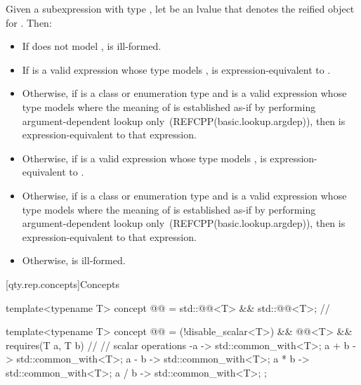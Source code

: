 \pnum
Given a subexpression  with type ,
let  be an lvalue that denotes the reified object for .
Then:
\begin{itemize}
\item
If  does not model ,
 is ill-formed.
\item
If  is a valid expression whose type models ,
 is expression-equivalent to .
\item
Otherwise, if  is a class or enumeration type and
 is a valid expression whose type models 
where the meaning of  is established as-if by performing argument-dependent lookup only~(REFCPP(basic.lookup.argdep)),
then  is expression-equivalent to that expression.
\item
Otherwise, if  is a valid expression whose type models ,
 is expression-equivalent to .
\item
Otherwise, if  is a class or enumeration type and
 is a valid expression whose type models 
where the meaning of  is established as-if by performing argument-dependent lookup only~(REFCPP(basic.lookup.argdep)),
then  is expression-equivalent to that expression.
\item
Otherwise,  is ill-formed.
\end{itemize}

[qty.rep.concepts]{Concepts}

\begin{itemdecl}
template<typename T>
concept @@ = std::@@<T> && std::@@<T>;  // \expos

template<typename T>
concept @@ = (!disable_scalar<T>) && @@<T> && requires(T a, T b) {  // \expos
  // scalar operations
  { -a } -> std::common_with<T>;
  { a + b } -> std::common_with<T>;
  { a - b } -> std::common_with<T>;
  { a * b } -> std::common_with<T>;
  { a / b } -> std::common_with<T>;
};
\end{itemdecl}

